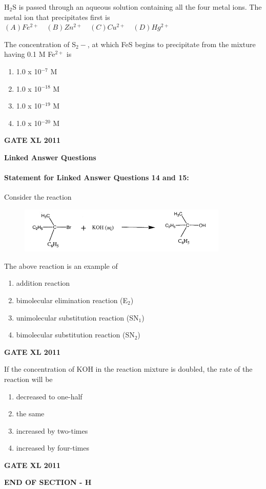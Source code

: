 \documentclass[journal,12pt,onecolumn]{IEEEtran}
\begin{document}
\begin{enumerate}
{\item {H$_2$S is passed through an aqueous solution containing all the four metal ions. The metal ion that precipitates first is}
	$(A) Fe^{2+} \quad (B) Zn^{2+} \quad(C) Cu^{2+} \quad(D) Hg^{2+}$}
\item {The concentration of S$_2-$, at which FeS begins to precipitate from the mixture having 0.1 M Fe$^{2+}$ is}
	\begin{enumerate}
\item{ 1.0 x 10$^{-7}$ M}

\item{ 1.0 x 10$^{-18}$ M}

\item{ 1.0 x 10$^{-19}$ M}

\item{ 1.0 x 10$^{-20}$ M}
	\end{enumerate}\hfill{\textbf{GATE XL 2011}}


\textbf{Linked Answer Questions}

\paragraph{Statement for Linked Answer Questions 14 and 15:}

Consider the reaction

	\begin{figure}[h!]
	\centering
		\includegraphics[width=10cm]{14}
	\caption*{}
	\label{fig:Q14}
	\end{figure}
\item {The above reaction is an example of}
		\begin{enumerate}
			\item{ addition reaction}
			\item{ bimolecular elimination reaction (E$_2$)}
			\item{ unimolecular substitution reaction (SN$_1$)}
			\item{ bimolecular substitution reaction (SN$_2$)}

		\end{enumerate}\hfill{\textbf{GATE XL 2011}}
	\item {If the concentration of KOH in the reaction mixture is doubled, the rate of the reaction will be}
		\begin{enumerate}
			\item{ decreased to one-half}
			\item{ the same }
			\item{ increased by two-times}
			\item{ increased by four-times}

		\end{enumerate}
		\hfill{\textbf{GATE XL 2011}}
\begin{center}
\textbf{END OF SECTION - H}
\end{center}
\end{enumerate}
\newpage
\end{document}

